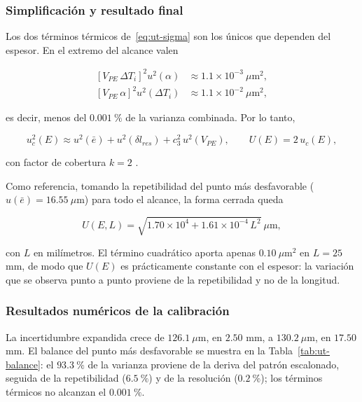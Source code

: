 \subsubsection{Simplificación y resultado final}
\label{sec:ut-simplificacion}

Los dos términos térmicos de~\eqref{eq:ut-sigma} son los únicos que dependen del
espesor. En el extremo del alcance valen

\begin{align}
  \left[V_{PE}\,\Delta T_i\right]^2 u^2(\alpha)
  &\approx 1.1\times10^{-3}\ \mu\text{m}^2, \label{eq:ut-term-alpha} \\
  \left[V_{PE}\,\alpha\right]^2 u^2(\Delta T_i)
  &\approx 1.1\times10^{-2}\ \mu\text{m}^2, \label{eq:ut-term-dT}
\end{align}

es decir, menos del $0.001\ \%$ de la varianza combinada. Por lo tanto,

\begin{equation}
  u_c^2(E) \approx u^2(\bar e) + u^2(\delta l_{res})
  + c_3^2\,u^2(V_{PE}),
  \qquad
  U(E) = 2\,u_c(E),
  \label{eq:ut-U}
\end{equation}

con factor de cobertura $k = 2$ \parencite{jcgm2008gum, inacal_pc029}.

Como referencia, tomando la repetibilidad del punto más desfavorable
($u(\bar e) = 16.55\ \mu\text{m}$) para todo el alcance, la forma cerrada
queda

\begin{equation}
  U(E,L) = \sqrt{1.70\times10^{4} + 1.61\times10^{-4}\,L^2}\ \mu\text{m},
  \label{eq:ut-U-vecL}
\end{equation}

con $L$ en milímetros. El término cuadrático aporta apenas
$0.10\ \mu\text{m}^2$ en $L = 25$ mm, de modo que $U(E)$ es prácticamente
constante con el espesor: la variación que se observa punto a punto proviene de la
repetibilidad y no de la longitud.

\subsubsection{Resultados numéricos de la calibración}
\label{sec:ut-resultados}



La incertidumbre expandida crece de $126.1\ \mu\text{m}$, en $2.50$ mm, a
$130.2\ \mu\text{m}$, en $17.50$ mm. El balance del punto más desfavorable se
muestra en la Tabla~\ref{tab:ut-balance}: el $93.3\ \%$ de la varianza proviene de
la deriva del patrón escalonado, seguida de la repetibilidad ($6.5\ \%$) y de la
resolución ($0.2\ \%$); los términos térmicos no alcanzan el $0.001\ \%$.

